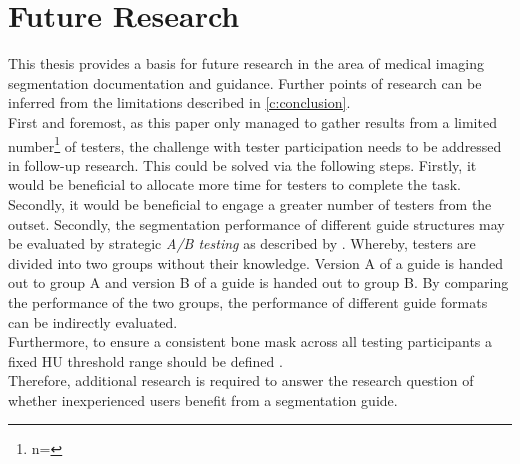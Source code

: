 \section*{Future Research}\label{c:future}
This thesis provides a basis for future research in the area of medical imaging segmentation documentation and guidance.
Further points of research can be inferred from the limitations described in \cref{c:conclusion}.\\
First and foremost, as this paper only managed to gather results from a limited number\footnote{n=\numberofTesters} of testers, 
the challenge with tester participation needs to be addressed in follow-up research.
This could be solved via the following steps.
Firstly, it would be beneficial to allocate more time for testers to complete the task.
Secondly, it would be beneficial to engage a greater number of testers from the outset.
Secondly, the segmentation performance of different guide structures may be evaluated by strategic \textit{A/B testing} as 
described by \citeauthor{brataUserExperienceImprovement2020}.
Whereby, testers are divided into two groups without their knowledge.
Version A of a guide is handed out to group A and version B of a guide is handed out to group B.
By comparing the performance of the two groups, the performance of different guide formats can be indirectly evaluated.\\
Furthermore, to ensure a consistent bone mask across all testing participants a fixed HU threshold range should be defined \cite{chavezGuidelinesMicroComputed2021}.\\
Therefore, additional research is required to answer the research question of whether inexperienced users benefit from a segmentation guide.
